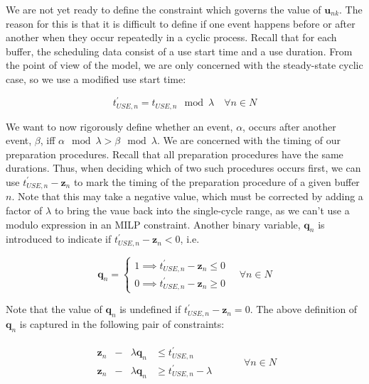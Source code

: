 We are not yet ready to define the constraint which governs the value of
$\boldsymbol{u}_{nk}$.
The reason for this is that it is difficult to define if one event happens
before or after another when they occur repeatedly in a cyclic process.
Recall that for each buffer, the scheduling data consist of a use start time
and a use duration.
From the point of view of the model, we are only concerned with the 
steady-state cyclic case, so we use a modified use start time:

\begin{equation}
    t_{USE,n}^{\prime} = t_{USE,n} \mod \lambda \quad \forall n \in N
\end{equation}

We want to now rigorously define whether an event, $\alpha$, occurs after
another event, $\beta$, iff $ \alpha \mod \lambda > \beta \mod \lambda $.
We are concerned with the timing of our preparation procedures.
Recall that all preparation procedures have the same durations.
Thus, when deciding which of two such procedures occurs first, we can use 
$ t_{USE,n}^{\prime} - \boldsymbol{z}_{n} $ to mark the timing of the
preparation procedure of a given buffer $n$.
Note that this may take a negative value, which must be corrected by adding a
factor of $\lambda$ to bring the vaue back into the single-cycle range, as we
can't use a modulo expression in an MILP constraint.
Another binary variable, $ \boldsymbol{q}_{n} $ is introduced to indicate if
$ t_{USE,n}^{\prime} - \boldsymbol{z}_{n} < 0 $, i.e. 

\begin{equation}
    \boldsymbol{q}_{n} =
    \begin{cases}
        1 \implies t_{USE,n}^{\prime} - \boldsymbol{z}_{n} \le 0\\
        0 \implies t_{USE,n}^{\prime} - \boldsymbol{z}_{n} \ge 0
    \end{cases}
    \quad \forall n \in N
\end{equation}

Note that the value of $ \boldsymbol{q}_{n} $ is undefined if 
$ t_{USE,n}^{\prime} - \boldsymbol{z}_{n} = 0 $.
The above definition of $ \boldsymbol{q}_{n} $ is captured in the following
pair of constraints:

\begin{equation}
    \begin{split}
        \begin{alignedat}{2}
            \boldsymbol{z}_{n} & {}-{} & \lambda \boldsymbol{q}_{n} & \le 
            t_{USE,n}^{\prime}\\
            \boldsymbol{z}_{n} & {}-{} & \lambda \boldsymbol{q}_{n} & \ge 
            t_{USE,n}^{\prime} - \lambda
        \end{alignedat}
    \end{split}
    \quad\quad
    \begin{split}
        \forall n \in N
    \end{split}
\end{equation}

